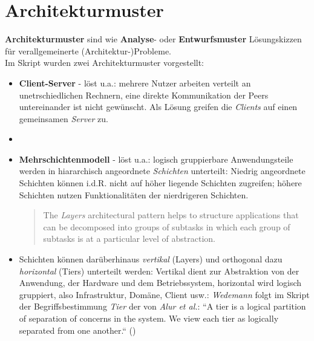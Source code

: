 \section{Architekturmuster}

\begin{tcolorbox}[title=Architekturmuster]

    \textbf{Architekturmuster} sind wie \textbf{Analyse}- oder \textbf{Entwurfsmuster} Lösungskizzen für verallgemeinerte (Architektur-)Probleme.\\
    Im Skript wurden zwei Architekturmuster vorgestellt:

    \begin{itemize}
        \item \textbf{Client-Server} - löst u.a.: mehrere Nutzer arbeiten verteilt an unetrschiedlichen Rechnern, eine direkte Kommunikation der Peers untereinander ist nicht gewünscht. Als Lösung greifen die \textit{Clients} auf einen gemeinsamen \textit{Server} zu.
        \item[]
        \item \textbf{Mehrschichtenmodell} - löst u.a.: logisch gruppierbare Anwendungsteile werden in hiararchisch angeordnete \textit{Schichten} unterteilt: Niedrig angeordnete Schichten können i.d.R. nicht auf höher liegende Schichten zugreifen; höhere Schichten nutzen Funktionalitäten der nierdrigeren Schichten.\\
        \blockquote[{\cite[31, Hervorhebung i.O.]{BMRS96}}]{
            The \textit{Layers} architectural pattern helps to structure applications that can be decomposed into groups of subtasks in which each group of subtasks is at a particular level of abstraction.
        }.
        \item[] Schichten können darüberhinaus \textit{vertikal} (Layers) und orthogonal dazu \textit{horizontal} (Tiers) unterteilt werden: Vertikal dient zur Abstraktion von der Anwendung, der Hardware und dem Betriebssystem, horizontal wird logisch gruppiert, also Infrastruktur, Domäne, Client usw.: \textit{Wedemann} folgt im Skript der Begriffsbestimmung \textit{Tier} der von \textit{Alur et al.}:  ``A tier is a logical partition of separation of concerns in the system. We view each tier as logically separated from one another.`` (\cite[120]{ACM03})
    \end{itemize}

\end{tcolorbox}